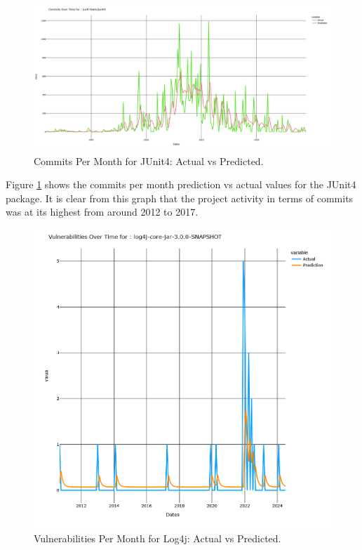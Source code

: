 \documentclass[conference]{IEEEtran}
\begin{document}
\begin{figure}
    \centering
    \includegraphics[width=1\linewidth]{JUnit4commits.png}
    \caption{Commits Per Month for JUnit4: Actual vs Predicted.} 
    \label{fig:commits}
\end{figure}

Figure \ref{fig:commits} shows the commits per month prediction vs actual values for the JUnit4 package. It is clear from this graph that the project activity in terms of commits was at its highest from around 2012 to 2017. 

\begin{figure}
    \centering
    \includegraphics[width=1\linewidth]{Log4jVuls.png}
    \caption{Vulnerabilities Per Month for Log4j: Actual vs Predicted.} 
    \label{fig:vulns}
\end{figure}
\end{document}
